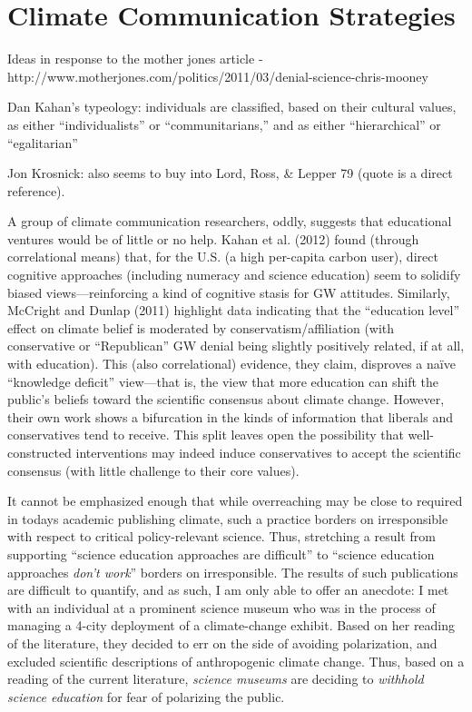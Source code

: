 \section{Climate Communication Strategies}

Ideas in response to the mother jones article -
http://www.motherjones.com/politics/2011/03/denial-science-chris-mooney 

Dan Kahan's typeology: individuals are classified, based on their cultural
values, as either “individualists” or “communitarians,” and as either
“hierarchical” or “egalitarian”

Jon Krosnick: also seems to buy into Lord, Ross, \& Lepper 79 (quote is a direct
reference).

A group of climate communication researchers, oddly, suggests that educational
ventures would be of little or no help.  Kahan et al. (2012) found (through
correlational means) that, for the U.S. (a high per-capita carbon user), direct
cognitive approaches (including numeracy and science education) seem to solidify
biased views---reinforcing a kind of cognitive stasis for GW attitudes.
Similarly, McCright and Dunlap (2011) highlight data indicating that the
``education level'' effect on climate belief is moderated by
conservatism/affiliation (with conservative or ``Republican'' GW denial being
slightly positively related, if at all, with education). This (also
correlational) evidence, they claim, disproves a naïve ``knowledge deficit''
view---that is, the view that more education can shift the public's beliefs
toward the scientific consensus about climate change. However, their own work
shows a bifurcation in the kinds of information that liberals and conservatives
tend to receive.
This split leaves open the possibility that well-constructed
interventions may indeed induce conservatives to accept the scientific consensus
(with little challenge to their core values).  

It cannot be emphasized enough that while overreaching may be close to required
in todays academic publishing climate, such a practice borders on irresponsible
with respect to critical policy-relevant science. Thus, stretching a result from
supporting “science education approaches are difficult” to “science education
approaches \emph{don't work}” borders on irresponsible. The results of such
publications are difficult to quantify, and as such, I am only able to offer an
anecdote: I met with an individual at a prominent science museum who
was in the process of managing a 4-city deployment of a climate-change exhibit.
Based on her reading of the literature, they decided to err on the side of
avoiding polarization, and excluded scientific descriptions of anthropogenic
climate change. Thus, based on a reading of the current literature,
\emph{science museums} are deciding to \emph{withhold science education} for
fear of polarizing the public.

